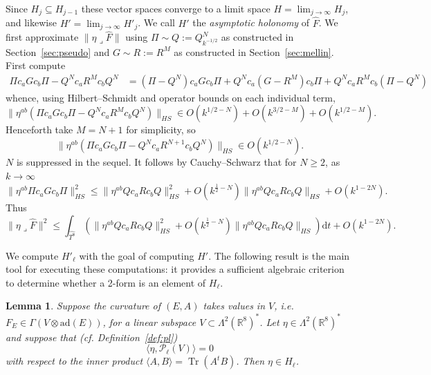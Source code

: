 \documentclass{article}
\newcommand{\di}{\mathrm{d}}
\newcommand{\wh}{\widehat}
\newcommand{\real}{\mathbb{R}}
\newcommand{\ad}{\mathrm{ad}}
\DeclareMathOperator{\Tr}{Tr}
\newtheorem{lemma}[theorem]{Lemma}
\theoremstyle{definition}
\theoremstyle{remark}
\begin{document}
Since $H_j \subseteq H_{j-1}$ these vector spaces converge to a limit space $H = \lim_{j\to \infty} H_j$, and likewise $H' = \lim_{j \to \infty} H'_j$.
We call $H'$ the \emph{asymptotic holonomy} of $\wh{F}$.
We first approximate $\| \eta \lrcorner \wh{F}\|$ using $\Pi \sim Q := Q^N_{k^{-1/2}}$ as constructed in Section~\ref{sec:pseudo} and $G \sim R := R^M$ as constructed in Section~\ref{sec:mellin}.
First compute
\begin{align*}
    \Pi c_a G c_b \Pi - Q^N c_a R^M c_b Q^N &= (\Pi - Q^N) c_a G c_b \Pi + Q^N c_a (G - R^M) c_b \Pi + Q^N c_a R^M c_b (\Pi - Q^N)
\end{align*}
whence, using Hilbert--Schmidt and operator bounds on each individual term,
\[
    \|\eta^{ab}(\Pi c_a G c_b \Pi - Q^N c_a R^M c_b Q^N)\|_{HS} \in O(k^{1/2-N}) + O(k^{3/2-M}) + O(k^{1/2-M}).
\]
Henceforth take $M = N + 1$ for simplicity, so 
\[
    \|\eta^{ab}(\Pi c_a G c_b \Pi - Q^N c_a R^{N+1} c_b Q^N)\|_{HS} \in O(k^{1/2-N}).
\]
$N$ is suppressed in the sequel.
It follows by Cauchy--Schwarz that for $N \ge 2$, as $k \to \infty$
\[
    \| \eta^{ab} \Pi c_a G c_b \Pi \|^2_{HS} \le  \| \eta^{ab} Q c_a R c_b Q \|^2_{HS} + O(k^{\frac12 - N})\| \eta^{ab} Q c_a R c_b Q \|_{HS} + O(k^{1 - 2N}).
\]
Thus
\begin{equation}
    \label{eq:approxcurv}
    \| \eta \lrcorner \wh{F}\|^2 \le \int_{\wh{T^8}} \left(\| \eta^{ab} Qc_a R c_b Q\|^2_{HS} + O(k^{\frac12 - N})\| \eta^{ab} Q c_a R c_b Q \|_{HS}\right)\di t + O(k^{1 - 2N}).
\end{equation}

We compute $H'_\ell$ with the goal of computing $H'$.
The following result is the main tool for executing these computations: it provides a sufficient algebraic criterion to determine whether a 2-form is an element of $H_\ell$.


\begin{lemma}
    \label{lem:AHfromVAN}
    Suppose the curvature of $(E, A)$ takes values in $V$, i.e. $F_E \in \Gamma(V \otimes \ad (E))$, for a linear subspace $V \subset \Lambda^2(\real^8)^*$.
    Let $\eta \in \Lambda^2 (\real^8)^*$ and suppose that (cf. Definition~\ref{def:pl})
    \[
        \langle \eta, \mathcal{P}_\ell(V) \rangle = 0
    \]
    with respect to the inner product $\langle A, B\rangle = \Tr(A^t B)$.
    Then $\eta \in H_\ell$.
\end{lemma}
\end{document}
